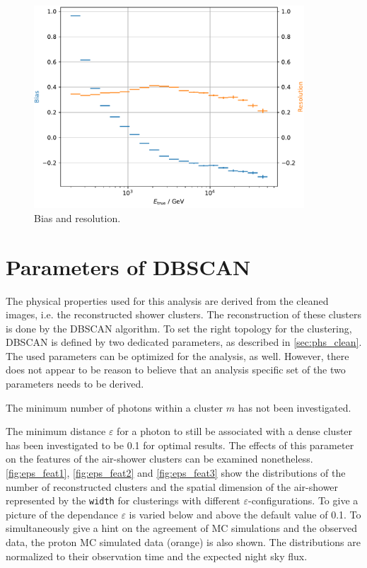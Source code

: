 \begin{figure}
  \centering
  \includegraphics[width=0.9\textwidth]{Plots/results/DBSCAN/bias_resolution.pdf}
  \caption{Bias and resolution.}
  \label{fig:bias}
\end{figure}
%


\section{Parameters of DBSCAN}
%
The physical properties used for this analysis are derived from the cleaned
images, i.e. the reconstructed shower clusters. The reconstruction of these
clusters is done by the DBSCAN algorithm. To set the right topology for the
clustering, DBSCAN is defined by two dedicated parameters, as described in
\autoref{sec:phs_clean}. The used parameters can be optimized for the analysis,
as well. However, there does not appear to be reason to believe that an
analysis specific set of the two parameters needs to be derived.

The minimum number of photons within a cluster $m$ has not been investigated.

The minimum distance $\varepsilon$ for a photon to still be associated with a
dense cluster has been investigated to be \num{0.1} for optimal results. The
effects of this parameter on the features of the air-shower clusters can be
examined nonetheless. \autoref{fig:eps_feat1}, \ref{fig:eps_feat2} and
\ref{fig:eps_feat3} show the distributions of the number of reconstructed
clusters and the spatial dimension of the air-shower represented by the
\texttt{width} for clusterings with different $\varepsilon$-configurations. To
give a picture of the dependance $\varepsilon$ is varied below and above the
default value of \num{0.1}. To simultaneously give a hint on the agreement of
MC simulations and the observed data, the proton MC simulated data (orange) is
also shown. The distributions are normalized to their observation time and the
expected night sky flux.

